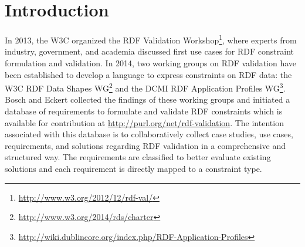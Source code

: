 \documentclass{llncs}
\begin{document}

\section{Introduction}


In 2013, the W3C organized the RDF Validation Workshop\footnote{\url{http://www.w3.org/2012/12/rdf-val/}}, 
where experts from industry, government, and academia discussed first use cases for RDF constraint formulation and validation.
In 2014, two working groups on RDF validation have been established to develop a language to express constraints on RDF data: 
the W3C RDF Data Shapes WG\footnote{\url{http://www.w3.org/2014/rds/charter}} and the DCMI RDF Application Profiles WG\footnote{\url{http://wiki.dublincore.org/index.php/RDF-Application-Profiles}}. 
Bosch and Eckert \cite{BoschEckert2014} collected the findings of these working groups and initiated a database of requirements to formulate and validate RDF constraints
which is available for contribution at \url{http://purl.org/net/rdf-validation}.
The intention associated with this database is to collaboratively collect case studies, use cases, requirements, and solutions regarding RDF validation in a comprehensive and structured way. 
The requirements are classified to better evaluate existing solutions and each requirement is directly mapped to a constraint type.
\end{document}
